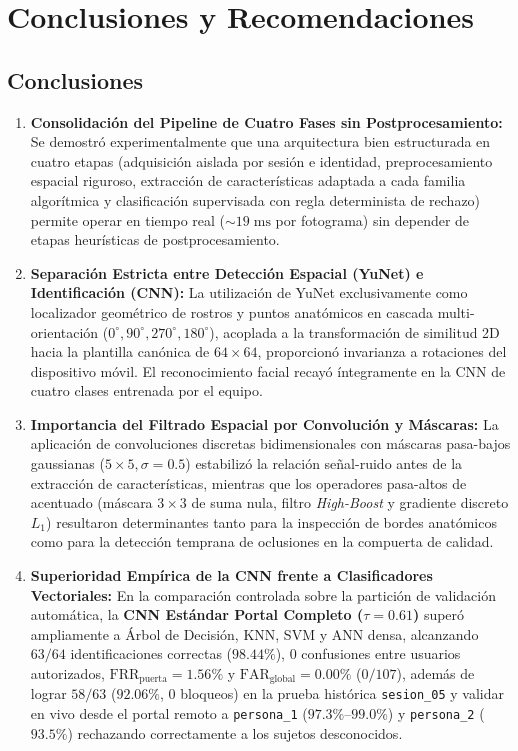 \documentclass{article}
\begin{document}
\section{Conclusiones y Recomendaciones}

\subsection{Conclusiones}

\begin{enumerate}
    \item \textbf{Consolidación del Pipeline de Cuatro Fases sin Postprocesamiento:} Se demostró experimentalmente que una arquitectura bien estructurada en cuatro etapas (adquisición aislada por sesión e identidad, preprocesamiento espacial riguroso, extracción de características adaptada a cada familia algorítmica y clasificación supervisada con regla determinista de rechazo) permite operar en tiempo real ($\sim 19\;\text{ms}$ por fotograma) sin depender de etapas heurísticas de postprocesamiento.
    \item \textbf{Separación Estricta entre Detección Espacial (YuNet) e Identificación (CNN):} La utilización de YuNet exclusivamente como localizador geométrico de rostros y puntos anatómicos en cascada multi-orientación ($0^\circ, 90^\circ, 270^\circ, 180^\circ$), acoplada a la transformación de similitud 2D hacia la plantilla canónica de $64 \times 64$, proporcionó invarianza a rotaciones del dispositivo móvil. El reconocimiento facial recayó íntegramente en la CNN de cuatro clases entrenada por el equipo.
    \item \textbf{Importancia del Filtrado Espacial por Convolución y Máscaras:} La aplicación de convoluciones discretas bidimensionales con máscaras pasa-bajos gaussianas ($5 \times 5, \sigma = 0.5$) estabilizó la relación señal-ruido antes de la extracción de características, mientras que los operadores pasa-altos de acentuado (máscara $3 \times 3$ de suma nula, filtro \textit{High-Boost} y gradiente discreto $L_1$) resultaron determinantes tanto para la inspección de bordes anatómicos como para la detección temprana de oclusiones en la compuerta de calidad.
    \item \textbf{Superioridad Empírica de la CNN frente a Clasificadores Vectoriales:} En la comparación controlada sobre la partición de validación automática, la \textbf{CNN Estándar Portal Completo ($\tau = 0.61$)} superó ampliamente a Árbol de Decisión, KNN, SVM y ANN densa, alcanzando $63/64$ identificaciones correctas ($98.44\%$), $0$ confusiones entre usuarios autorizados, $\text{FRR}_{\text{puerta}} = 1.56\%$ y $\text{FAR}_{\text{global}} = 0.00\%$ ($0/107$), además de lograr $58/63$ ($92.06\%$, $0$ bloqueos) en la prueba histórica \texttt{sesion\_05} y validar en vivo desde el portal remoto a \texttt{persona\_1} ($97.3\%\text{--}99.0\%$) y \texttt{persona\_2} ($93.5\%$) rechazando correctamente a los sujetos desconocidos.

\end{enumerate}
\end{document}
